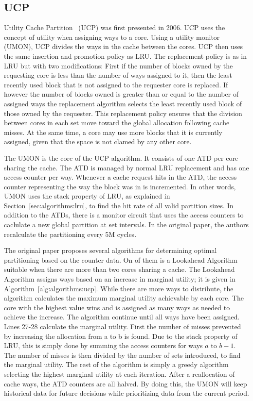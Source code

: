 \subsection{UCP}
\label{sec:algorithms:ucp}

Utility Cache Partition~\cite{Qureshi2006} (UCP) was first presented in 2006. 
UCP uses the concept of utility when assigning ways to a core.
Using a utility monitor (UMON), UCP divides the ways in the cache between the cores.
UCP then uses the same insertion and promotion policy as LRU.
The replacement policy is as in LRU but with two modifications:
First if the number of blocks owned by the requesting core is less than the number of ways assigned to it, then the least recently used block that is not assigned to the requester core is replaced.
If however the number of blocks owned is greater than or equal to the number of assigned ways the replacement algorithm selects the least recently used block of those owned by the requester.
This replacement policy ensures that the division between cores in each set move toward the global allocation following cache misses.
At the same time, a core may use more blocks that it is currently assigned, given that the space is not clamed by any other core.

The UMON is the core of the UCP algorithm.
It consists of one ATD per core sharing the cache. 
The ATD is managed by normal LRU replacement and has one access counter per way.
Whenever a cache request hits in the ATD, the access counter representing the way the block was in is incremented.
In other words, UMON uses the stack property of LRU, as explained in Section~\ref{sec:algorithms:lru}, to find the hit rate of all valid partition sizes.
In addition to the ATDs, there is a monitor circuit that uses the access counters to caclulate a new global partition at set intervals.
In the original paper, the authors recalculate the partitioning every 5M cycles.

The original paper proposes several algorithms for determining optimal partitioning based on the counter data. 
On of them is a Lookahead Algorithm suitable when there are more than two cores sharing a cache.
The Lookahead Algorithm assigns ways based on an increase in marginal utility; it is given in Algorithm~\ref{alg:algorithms:ucp}.
While there are more ways to distribute, the algorithm calculates the maximum marginal utility achievable by each core. 
The core with the highest value wins and is assigned as many ways as needed to achieve the increase.
The algorithm continue until all ways have been assigned.
Lines 27-28 calculate the marginal utility. 
First the number of misses prevented by increasing the allocation from a to b is found.
Due to the stack property of LRU, this is simply done by summing the access counters for ways $a$ to $b-1$.
The number of misses is then divided by the number of sets introduced, to find the marginal utility.
The rest of the algorithm is simply a greedy algorithm selecting the highest marginal utility at each iteration.
After a reallocation of cache ways, the ATD counters are all halved.
By doing this, the UMON will keep historical data for future decisions while prioritizing data from the current period.


